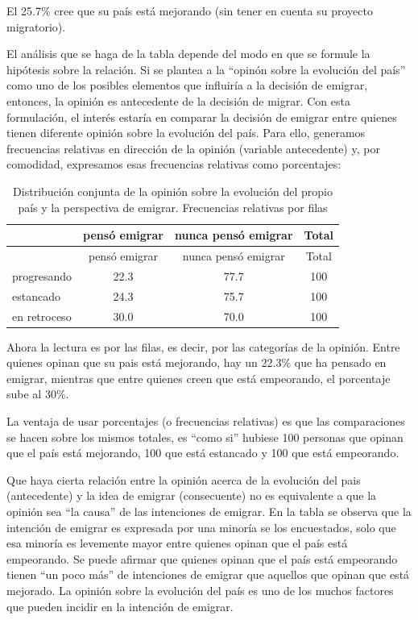 \documentclass[]{book}
\begin{document}
El 25.7\% cree que su país está mejorando (sin tener en cuenta su proyecto migratorio).

El análisis que se haga de la tabla depende del modo en que se formule la hipótesis sobre la relación. Si se plantea a la ``opinón sobre la evolución del país'' como uno de los posibles elementos que influiría a la decisión de emigrar, entonces, la opinión es antecedente de la decisión de migrar. Con esta formulación, el interés estaría en comparar la decisión de emigrar entre quienes tienen diferente opinión sobre la evolución del país. Para ello, generamos frecuencias relativas en dirección de la opinión (variable antecedente) y, por comodidad, expresamos esas frecuencias relativas como porcentajes:

\begin{longtable}[]{@{}lccc@{}}
\caption{\label{tab:unnamed-chunk-116}Distribución conjunta de la opinión sobre la evolución del propio país y la perspectiva de emigrar. Frecuencias relativas por filas}\tabularnewline
\toprule
& pensó emigrar & nunca pensó emigrar & Total\tabularnewline
\midrule
\endfirsthead
\toprule
& pensó emigrar & nunca pensó emigrar & Total\tabularnewline
\midrule
\endhead
progresando & 22.3 & 77.7 & 100\tabularnewline
estancado & 24.3 & 75.7 & 100\tabularnewline
en retroceso & 30.0 & 70.0 & 100\tabularnewline
\bottomrule
\end{longtable}

Ahora la lectura es por las filas, es decir, por las categorías de la opinión. Entre quienes opinan que su pais está mejorando, hay un 22.3\% que ha pensado en emigrar, mientras que entre quienes creen que está empeorando, el porcentaje sube al 30\%.

La ventaja de usar porcentajes (o frecuencias relativas) es que las
comparaciones se hacen sobre los mismos totales, es ``como si'' hubiese
100 personas que opinan que el país está mejorando, 100 que está estancado y 100 que está empeorando.

Que haya cierta relación entre la opinión acerca de la evolución del pais (antecedente) y la idea de emigrar (consecuente) no es equivalente a que la opinión sea ``la causa'' de las intenciones de emigrar. En la tabla se observa que la intención de emigrar es expresada por una minoría se los encuestados, solo que esa minoría es levemente mayor entre quienes opinan que el país está empeorando. Se puede afirmar que quienes opinan que el país está empeorando tienen ``un poco más'' de intenciones de emigrar que aquellos que opinan que está mejorado. La opinión sobre la evolución del país es uno de los muchos factores que pueden incidir en la intención de emigrar.
\end{document}
